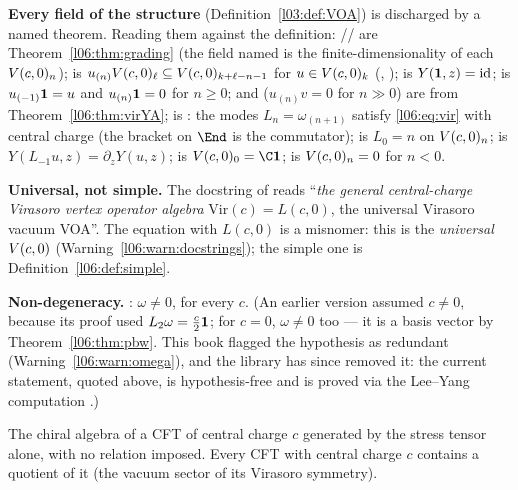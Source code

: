 \begin{dictionary}
\textbf{Every field of the structure}  (Definition~\ref{l03:def:VOA}) is
discharged by a named theorem. Reading them against the definition: //
 are Theorem~\ref{l06:thm:grading} (the field named  is the
finite-dimensionality of each $V(c,0)_n$);  is $u_{(n)}V(c,0)_\ell\subseteq
V(c,0)_{k+\ell-n-1}$ for $u\in V(c,0)_k$ (, );
 is $Y(\mathbf{1},z) = \mathrm{id}$;  is $u_{(-1)}\mathbf{1} = u$ and $u_{(n)}\mathbf{1} = 0$
for $n\ge0$;  and  ($u_{(n)}v = 0$ for $n\gg0$) are from
Theorem~\ref{l06:thm:virYA};  is : the modes
$L_n = \omega_{(n+1)}$ satisfy \eqref{l06:eq:vir} with central charge  (the bracket 
on $\End$ is the commutator);  is $L_0 = n$ on $V(c,0)_n$;  is
$Y(L_{-1}u,z) = \partial_zY(u,z)$;  is $\lsixV_0 = \C\lsixvac$;  is
$V(c,0)_n = 0$ for $n<0$.

\textbf{Universal, not simple.} The docstring of  reads ``\emph{the general
central-charge Virasoro vertex operator algebra} $\mathrm{Vir}(c) = L(c,0)$, the universal Virasoro vacuum
VOA''. The equation with $L(c,0)$ is a misnomer: this is the \emph{universal} $V(c,0)$
(Warning~\ref{l06:warn:docstrings}); the simple one is Definition~\ref{l06:def:simple}.

\textbf{Non-degeneracy.} : $\omega\ne0$, for every $c$. (An earlier version assumed
$c\ne0$, because its proof used $L_2\omega = \frac c2\mathbf{1}$; for $c = 0$, $\omega\ne0$ too --- it is a basis
vector by Theorem~\ref{l06:thm:pbw}. This book flagged the hypothesis as redundant (Warning~\ref{l06:warn:omega}), and the library has
since removed it: the current statement, quoted above, is hypothesis-free and is proved via the Lee--Yang
computation .)
\end{dictionary}

\begin{physics}
The chiral algebra of a CFT of central charge $c$ generated by the stress tensor alone, with no relation
imposed. Every CFT with central charge $c$ contains a quotient of it (the vacuum sector of its Virasoro
symmetry).
\end{physics}

